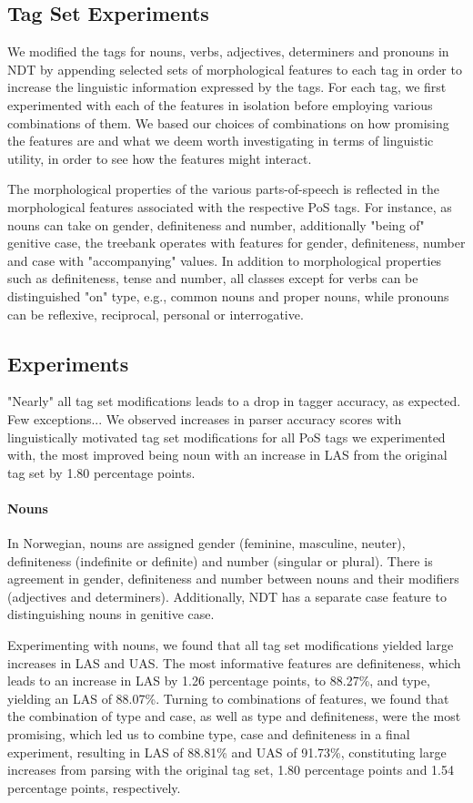 \documentclass[11pt,a4paper]{article}
\begin{document}
\subsection{Tag Set Experiments}
We modified the tags for nouns, verbs, adjectives, determiners and pronouns in
NDT by appending selected sets of morphological features to each tag in order
to increase the linguistic information expressed by the tags.  For each tag, we
first experimented with each of the features in isolation before employing
various combinations of them. We based our choices of combinations on how
promising the features are and what we deem worth investigating in terms of
linguistic utility, in order to see how the features might interact.

The morphological properties of the various parts-of-speech is reflected in the
morphological features associated with the respective PoS tags. For instance,
as nouns can take on gender, definiteness and number, additionally "being of"
genitive case, the treebank operates with features for gender, definiteness,
number and case with "accompanying" values. In addition to
morphological properties such as definiteness, tense and number, all classes
except for verbs can be distinguished "on" type, e.g., common nouns and proper
nouns, while pronouns can be reflexive, reciprocal, personal or interrogative.

\subsection{Experiments}
"Nearly" all tag set modifications leads to a drop in tagger accuracy, as
expected. Few exceptions... We observed increases in parser accuracy scores
with linguistically motivated tag set modifications for all PoS tags we
experimented with, the most improved being noun with an increase in LAS from
the original tag set by 1.80 percentage points.

\paragraph{Nouns}
In Norwegian, nouns are assigned gender (feminine, masculine, neuter),
definiteness (indefinite or definite) and number (singular or plural). There
is agreement in gender, definiteness and number between nouns and their
modifiers (adjectives and determiners). Additionally, NDT has a separate case
feature to distinguishing nouns in genitive case.

Experimenting with nouns, we found that all tag set modifications yielded large
increases in LAS and UAS. The most informative features are definiteness, which
leads to an increase in LAS by 1.26 percentage points, to 88.27\%, and type,
yielding an LAS of 88.07\%. Turning to combinations of features, we found that
the combination of type and case, as well as type and definiteness, were the
most promising, which led us to combine type, case and definiteness in a final
experiment, resulting in LAS of 88.81\% and UAS of 91.73\%, constituting large
increases from parsing with the original tag set, 1.80 percentage points
and 1.54 percentage points, respectively.
\end{document}
